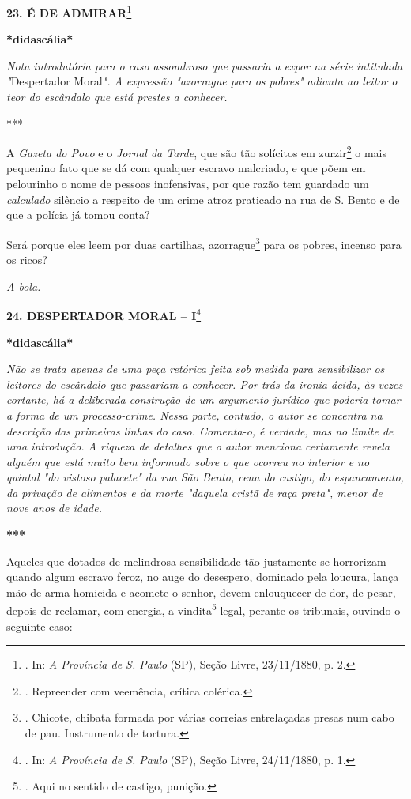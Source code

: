 \textbf{23. É DE ADMIRAR}\footnote{. In: \emph{A Província de S. Paulo}
  (SP), Seção Livre, 23/11/1880, p. 2.}

\textbf{*didascália*}

\emph{Nota introdutória para o caso assombroso que passaria a expor na
série intitulada "}Despertador Moral\emph{". A expressão "azorrague para
os pobres" adianta ao leitor o teor do escândalo que está prestes a
conhecer. }

***

A \emph{Gazeta do Povo} e o \emph{Jornal da Tarde}, que são tão
solícitos em zurzir\footnote{. Repreender com veemência, crítica
  colérica.} o mais pequenino fato que se dá com qualquer escravo
malcriado, e que põem em pelourinho o nome de pessoas inofensivas, por
que razão tem guardado um \emph{calculado} silêncio a respeito de um
crime atroz praticado na rua de S. Bento e de que a polícia já tomou
conta?

Será porque eles leem por duas cartilhas, azorrague\footnote{. Chicote,
  chibata formada por várias correias entrelaçadas presas num cabo de
  pau. Instrumento de tortura.}
para os pobres, incenso
para os ricos?

\emph{A bola.}

\textbf{24. DESPERTADOR MORAL -- I}\footnote{. In: \emph{A Província de
  S. Paulo} (SP), Seção Livre, 24/11/1880, p. 1.}

\textbf{*didascália*}

\emph{Não se trata apenas de uma peça retórica feita sob medida para
sensibilizar os leitores do escândalo que passariam a conhecer. Por trás
da ironia ácida, às vezes cortante, há a deliberada construção de um
argumento jurídico que poderia tomar a forma de um processo-crime. Nessa
parte, contudo, o autor se concentra na descrição das primeiras linhas
do caso. Comenta-o, é verdade, mas no limite de uma introdução. A
riqueza de detalhes que o autor menciona certamente revela alguém que
está muito bem informado sobre o que ocorreu no interior e no quintal
"do vistoso palacete" da rua São Bento, cena do castigo, do
espancamento, da privação de alimentos e da morte "daquela cristã de
raça preta", menor de nove anos de idade. }

\textbf{***}

Aqueles que dotados de melindrosa sensibilidade tão justamente se
horrorizam quando algum escravo feroz, no auge do desespero, dominado
pela loucura, lança mão de arma homicida e acomete o senhor, devem
enlouquecer de dor, de pesar, depois de reclamar, com energia, a
vindita\footnote{. Aqui no sentido de castigo, punição.} legal, perante
os tribunais, ouvindo o seguinte caso:

